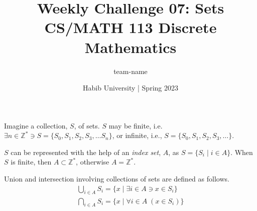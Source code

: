 \documentclass[a4paper]{exam}
\title{Weekly Challenge 07: Sets\\CS/MATH 113 Discrete Mathematics}
\author{team-name}  %
\date{Habib University | Spring 2023}
\newcommand\mbb[1]{\ensuremath{\mathbb{#1}}}
\begin{document}
\maketitle

\begin{questions}

  Imagine a collection, $S$, of sets. $S$ may be finite, i.e. $\exists n\in \mbb{Z}^*\ni S = \{S_0,S_1,S_2, S_3, \ldots S_n\}$, or infinite, i.e., $S = \{S_0,S_1,S_2, S_3, \ldots \}$.

  $S$ can be represented with the help of an \textit{index set}, $A$, as $S = \{S_i\mid i \in A\}$. When $S$ is finite, then $A\subset \mbb{Z}^*$, otherwise $A=\mbb{Z}^*$.

  Union and intersection involving collections of sets are defined as follows.
  \begin{align*}
    \bigcup_{i \in A}S_i = \{x\mid \exists i \in A \ni x \in S_i\}\\
    \bigcap_{i \in A}S_i = \{x\mid\forall i \in A\; (x \in S_i)\}
  \end{align*}
  
  \begin{solution}
    \end{solution}

\end{questions}
\end{document}
